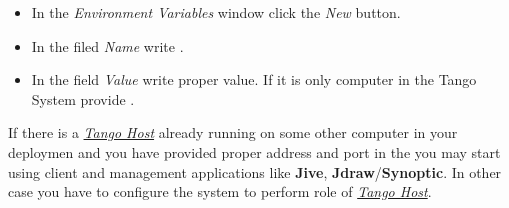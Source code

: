 \documentclass[letterpaper,10pt,english]{sphinxmanual}
\begin{document}
\begin{itemize}
\begin{description}
\begin{itemize}
\item {} 
In the \emph{Environment Variables} window click the \emph{New} button.

\item {} 
In the filed \emph{Name} write .

\item {} 
In the field \emph{Value} write proper value. If it is only computer in the Tango System provide .

\end{itemize}

\end{description}

\end{itemize}

If there is a {\hyperref[glossary:term-tango-host]{\emph{Tango Host}}} already running on some other computer in your deploymen and you have provided proper
address and port in the  you may start using client and management applications like
\textbf{Jive}, \textbf{Jdraw}/\textbf{Synoptic}. In other case you have to configure the system to perform role of
{\hyperref[glossary:term-tango-host]{\emph{Tango Host}}}.
\end{document}
